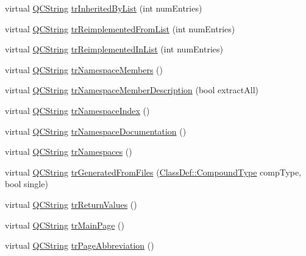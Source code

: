 \begin{DoxyCompactItemize}
virtual \mbox{\hyperlink{class_q_c_string}{Q\+C\+String}} \mbox{\hyperlink{class_translator_norwegian_aa502aa5abad02bfb785ed1575f2d61ff}{tr\+Inherited\+By\+List}} (int num\+Entries)
\item 
virtual \mbox{\hyperlink{class_q_c_string}{Q\+C\+String}} \mbox{\hyperlink{class_translator_norwegian_a3698ea1a6022ce90bc1fdfeec9107a38}{tr\+Reimplemented\+From\+List}} (int num\+Entries)
\item 
virtual \mbox{\hyperlink{class_q_c_string}{Q\+C\+String}} \mbox{\hyperlink{class_translator_norwegian_a98857e9c8814edbf6902174f189431da}{tr\+Reimplemented\+In\+List}} (int num\+Entries)
\item 
virtual \mbox{\hyperlink{class_q_c_string}{Q\+C\+String}} \mbox{\hyperlink{class_translator_norwegian_ae84636b174085a859d8148f19f9269af}{tr\+Namespace\+Members}} ()
\item 
virtual \mbox{\hyperlink{class_q_c_string}{Q\+C\+String}} \mbox{\hyperlink{class_translator_norwegian_ac3e851e771f6d68cd6e1b8927b3af0d5}{tr\+Namespace\+Member\+Description}} (bool extract\+All)
\item 
virtual \mbox{\hyperlink{class_q_c_string}{Q\+C\+String}} \mbox{\hyperlink{class_translator_norwegian_a9ad74ebb1b841012158985eeff47bfcf}{tr\+Namespace\+Index}} ()
\item 
virtual \mbox{\hyperlink{class_q_c_string}{Q\+C\+String}} \mbox{\hyperlink{class_translator_norwegian_aecd64d94d95be5bc4bd4dada4e589c2c}{tr\+Namespace\+Documentation}} ()
\item 
virtual \mbox{\hyperlink{class_q_c_string}{Q\+C\+String}} \mbox{\hyperlink{class_translator_norwegian_ab57d4f3c731565e70e9c669512608259}{tr\+Namespaces}} ()
\item 
virtual \mbox{\hyperlink{class_q_c_string}{Q\+C\+String}} \mbox{\hyperlink{class_translator_norwegian_a96e08286372c9e3c8537de97355f1e00}{tr\+Generated\+From\+Files}} (\mbox{\hyperlink{class_class_def_ae70cf86d35fe954a94c566fbcfc87939}{Class\+Def\+::\+Compound\+Type}} comp\+Type, bool single)
\item 
virtual \mbox{\hyperlink{class_q_c_string}{Q\+C\+String}} \mbox{\hyperlink{class_translator_norwegian_a9b4ab20df4866fc01400711a887019c0}{tr\+Return\+Values}} ()
\item 
virtual \mbox{\hyperlink{class_q_c_string}{Q\+C\+String}} \mbox{\hyperlink{class_translator_norwegian_a5bd6c96821a9d80b2dc3c54ecf11e183}{tr\+Main\+Page}} ()
\item 
virtual \mbox{\hyperlink{class_q_c_string}{Q\+C\+String}} \mbox{\hyperlink{class_translator_norwegian_a4fca097c64f4c71f4b33495cf2e3530c}{tr\+Page\+Abbreviation}} ()

\end{DoxyCompactItemize}
